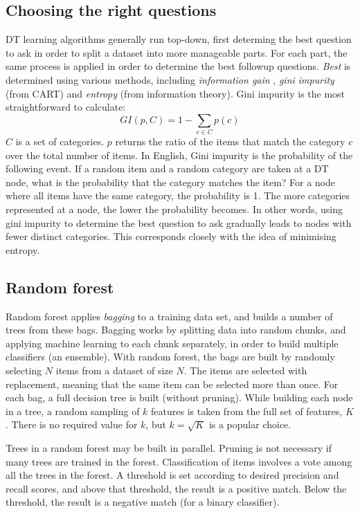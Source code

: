 \subsection{Choosing the right questions}
DT learning algorithms generally run top-down, first determing the best
question to ask in order to split a dataset into more manageable
parts.  For each part, the same process is applied in order to
determine the best followup questions.  {\it Best} is determined
using various methods, including {\it information gain}
\cite{quinlan1986}, {\it gini impurity} (from CART) and {\it entropy}
(from information theory). Gini impurity is the most straightforward
to calculate:
\begin{equation}
    GI(p, C) = 1 - \sum_{c \in C}p(c)
\end{equation}
$C$ is a set of categories. $p$ returns the ratio of the items that
match the category $c$ over the total number of items.  In English,
Gini impurity is the probability of the following event.  If a random item and
a random category are taken at a DT node, what is the probability
that the category matches the item?  For a node where all items
have the same category, the probability is 1.  The more categories
represented at a node, the lower the probability becomes.  In other
words, using gini impurity to determine the best question to ask
gradually leads to nodes with fewer distinct categories.  This
corresponds closely with the idea of minimising entropy.

\subsection{Random forest}
Random forest \cite{ho1995} applies {\it bagging} to a training data set, and
builds a number of trees from these bags.  Bagging works by
splitting data into random chunks, and applying machine learning
to each chunk separately, in order to build multiple classifiers
(an ensemble).  With random forest, the bags are built by randomly
selecting $N$ items from a dataset of size $N$.  The items are
selected with replacement, meaning that the same item can be
selected more than once.  For each bag, a full decision tree is
built (without pruning).  While building each node in a tree,
a random sampling of $k$ features is taken from the full set of
features, $K$.  There is no required value for $k$, but $k = \sqrt{K}$
is a popular choice.

Trees in a random forest may be built in parallel.  Pruning is not
necessary if many trees are trained in the forest.  Classification
of items involves a vote among all the trees in the forest.  A
threshold is set according to desired precision and recall scores,
and above that threshold, the result is a positive match.
Below the threshold, the result is a negative match (for
a binary classifier).

